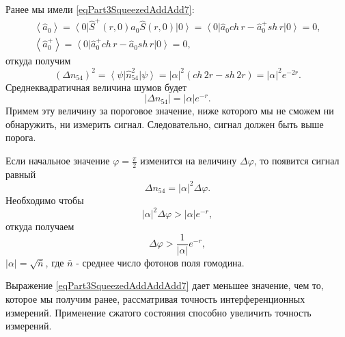Ранее мы имели \eqref{eqPart3SqueezedAddAdd7}:
\begin{eqnarray}
\left<\hat{a}_0\right> = 
\left<0\right|
\hat{S}^{+}\left(r, 0\right)
\hat{a}_0
\hat{S}\left(r, 0\right)
\left|0\right> = 
\left<0\right|
\hat{a}_0 ch\,r - \hat{a}_0^{+} sh\,r
\left|0\right> = 0,
\nonumber \\
\left<\hat{a}_0^{+}\right> = 
\left<0\right|
\hat{a}_0^{+} ch\,r - \hat{a}_0 sh\,r
\left|0\right> = 0,
\nonumber
\end{eqnarray}
откуда получим
\begin{equation}
\left(\Delta n_{54}\right)^2 = 
\left<\psi\right|\hat{n}_{54}^2\left|\psi\right> =
\left|\alpha\right|^2\left(
ch\,2r - sh\,2r
\right) = 
\left|\alpha\right|^2 e^{-2 r}.
\nonumber
\end{equation}
Среднеквадратичная величина шумов будет 
\[
\left|\Delta n_{54}\right| = 
\left|\alpha\right| e^{- r}.
\]
Примем эту величину за пороговое значение, ниже которого мы не сможем
ни обнаружить, ни измерить сигнал. Следовательно, сигнал должен быть
выше порога.

Если начальное значение $\varphi=\frac{\pi}{2}$ изменится на величину $\Delta
\varphi$, то появится сигнал равный
\[
\Delta n_{54} = 
\left|\alpha\right|^2
\Delta \varphi.
\]
Необходимо чтобы 
\[
\left|\alpha\right|^2
\Delta \varphi > 
\left|\alpha\right|
e^{-r},
\]
откуда получаем
\begin{equation}
\Delta \varphi >
\frac{1}{\left|\alpha\right|} e^{-r},
\label{eqPart3SqueezedAddAddAdd7}
\end{equation}
$\left|\alpha\right| = \sqrt{\bar{n}}$, где $\bar{n}$ - среднее число
фотонов поля гомодина.

Выражение \eqref{eqPart3SqueezedAddAddAdd7} дает меньшее значение, чем
то, которое мы получим ранее, рассматривая точность интерференционных
измерений. Применение сжатого состояния способно увеличить точность
измерений. 
